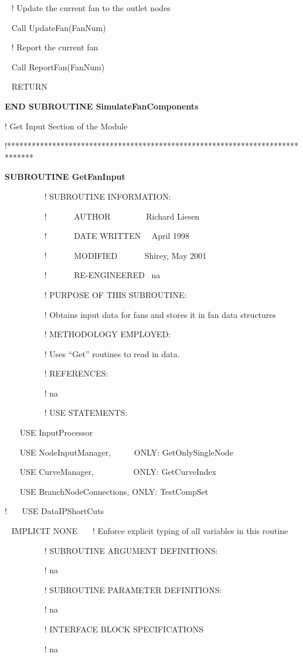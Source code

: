 ~ ! Update the current fan to the outlet nodes

~ Call UpdateFan(FanNum)

~ ! Report the current fan

~ Call ReportFan(FanNum)

~ RETURN

\textbf{END SUBROUTINE SimulateFanComponents}

! Get Input Section of the Module

!******************************************************************************

\textbf{SUBROUTINE GetFanInput}

~~~~~~~~~ ! SUBROUTINE INFORMATION:

~~~~~~~~~ !~~~~~~ AUTHOR~~~~~~~~ Richard Liesen

~~~~~~~~~ !~~~~~~ DATE WRITTEN~~ April 1998

~~~~~~~~~ !~~~~~~ MODIFIED~~~~~~ Shirey, May 2001

~~~~~~~~~ !~~~~~~ RE-ENGINEERED~ na

~~~~~~~~~ ! PURPOSE OF THIS SUBROUTINE:

~~~~~~~~~ ! Obtains input data for fans and stores it in fan data structures

~~~~~~~~~ ! METHODOLOGY EMPLOYED:

~~~~~~~~~ ! Uses ``Get'' routines to read in data.

~~~~~~~~~ ! REFERENCES:

~~~~~~~~~ ! na

~~~~~~~~~ ! USE STATEMENTS:

~~~ USE InputProcessor

~~~ USE NodeInputManager,~~~~~ ONLY: GetOnlySingleNode

~~~ USE CurveManager,~~~~~~~~~ ONLY: GetCurveIndex

~~~ USE BranchNodeConnections, ONLY: TestCompSet

!~~~ USE DataIPShortCuts

~ IMPLICIT NONE~~~ ! Enforce explicit typing of all variables in this routine

~~~~~~~~~ ! SUBROUTINE ARGUMENT DEFINITIONS:

~~~~~~~~~ ! na

~~~~~~~~~ ! SUBROUTINE PARAMETER DEFINITIONS:

~~~~~~~~~ ! na

~~~~~~~~~ ! INTERFACE BLOCK SPECIFICATIONS

~~~~~~~~~ ! na

